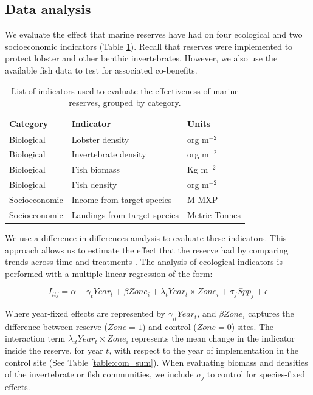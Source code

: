 \documentclass{frontiersSCNS}
\theoremstyle{definition}
\theoremstyle{definition}
\theoremstyle{definition}
\theoremstyle{remark}
\begin{document}
\subsection{Data analysis}\label{data-analysis}

We evaluate the effect that marine reserves have had on four ecological
and two socioeconomic indicators (Table \ref{table:indicators}). Recall
that reserves were implemented to protect lobster and other benthic
invertebrates. However, we also use the available fish data to test for
associated co-benefits.

\begin{table}[H]

\caption{\label{tab:unnamed-chunk-3}\label{table:indicators}List of indicators used to evaluate the effectiveness of marine reserves, grouped by category.}
\centering
\begin{tabular}[t]{l|l|l}
\hline
Category & Indicator & Units\\
\hline
Biological & Lobster density & org $\mathrm{m}^{-2}$\\
\hline
Biological & Invertebrate density & org $\mathrm{m}^{-2}$\\
\hline
Biological & Fish biomass & Kg $\mathrm{m}^{-2}$\\
\hline
Biological & Fish density & org $\mathrm{m}^{-2}$\\
\hline
Socioeconomic & Income from target species & M MXP\\
\hline
Socioeconomic & Landings from target species & Metric Tonnes\\
\hline
\end{tabular}
\end{table}

\clearpage

We use a difference-in-differences analysis to evaluate these
indicators. This approach allows us to estimate the effect that the
reserve had by comparing trends across time and treatments
\citep{moland_2013-VP,Villasenor-Derbez_2018}. The analysis of
ecological indicators is performed with a multiple linear regression of
the form:

\begin{equation}
I_{itj} = \alpha + \gamma_{t} Year_t + \beta Zone_i + \lambda_{t} Year_t\times Zone_i + \sigma_jSpp_j + \epsilon
\label{eqn:reg_bio}
\end{equation}

Where year-fixed effects are represented by \(\gamma_{it} Year_t\), and
\(\beta Zone_i\) captures the difference between reserve (\(Zone = 1\))
and control (\(Zone = 0\)) sites. The interaction term
\(\lambda_{it} Year_t\times Zone_i\) represents the mean change in the
indicator inside the reserve, for year \(t\), with respect to the year
of implementation in the control site (See Table \ref{table:com_sum}).
When evaluating biomass and densities of the invertebrate or fish
communities, we include \(\sigma_j\) to control for species-fixed
effects.
\end{document}
